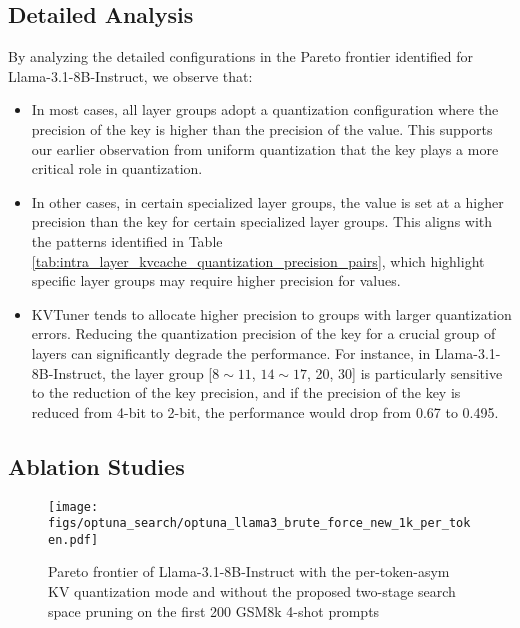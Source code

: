 \subsection{Detailed Analysis}
\label{sec:detailed_analysis_layer_wise_selection}

By analyzing the detailed configurations in the Pareto frontier identified for Llama-3.1-8B-Instruct, we observe that:

\begin{itemize}
\item  In most cases, all layer groups adopt a quantization configuration where the precision of the key is higher than the precision of the value. This supports our earlier observation from uniform quantization that the key plays a more critical role in quantization.

\item In other cases, in certain specialized layer groups, the value is set at a higher precision than the key for certain specialized layer groups. This aligns with the patterns identified in Table \ref{tab:intra_layer_kvcache_quantization_precision_pairs}, which highlight specific layer groups may require higher precision for values.

\item KVTuner tends to allocate higher precision to groups with larger quantization errors. Reducing the quantization precision of the key for a crucial group of layers can significantly degrade the performance. For instance, in Llama-3.1-8B-Instruct, the layer group [$8\sim11$, $14\sim17$, 20, 30] is particularly sensitive to the reduction of the key precision, and if the precision of the key is reduced from 4-bit to 2-bit, the performance would drop from 0.67 to 0.495.
\end{itemize}

\subsection{Ablation Studies}

\begin{figure}
    \centering
    \texttt{[image: figs/optuna\_search/optuna\_llama3\_brute\_force\_new\_1k\_per\_token.pdf]}
    \caption{Pareto frontier of Llama-3.1-8B-Instruct with the per-token-asym KV quantization mode and without the proposed two-stage search space pruning on the first 200 GSM8k 4-shot prompts}
    \label{fig:pareto_frontier_per_token_asym_gsm8k_limit_200_llama3_instruct_brute_force}
\end{figure}

